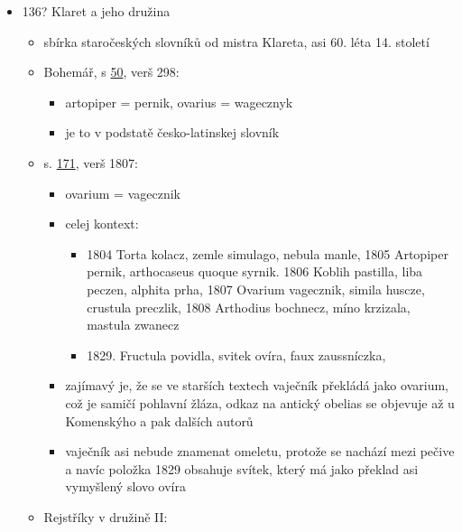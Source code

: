 \begin{itemize}
\tightlist
\item
  136? Klaret a jeho družina

  \begin{itemize}
  \tightlist
  \item
    sbírka staročeských slovníků od mistra Klareta, asi 60. léta 14.
    století
  \item
    Bohemář, s
    \href{https://sources.cms.flu.cas.cz/src/index.php?s=v&bookid=832&page=84}{50},
    verš 298:

    \begin{itemize}
    \tightlist
    \item
      artopiper = pernik, ovarius = wagecznyk
    \item
      je to v podstatě česko-latinskej slovník
    \end{itemize}
  \item
    s.
    \href{https://nlp.fi.muni.cz/projekty/ahisto/portal/book/832?lpage=171&search=vage}{171},
    verš 1807:

    \begin{itemize}
    \tightlist
    \item
      ovarium = vagecznik
    \item
      celej kontext:

      \begin{itemize}
      \tightlist
      \item
        1804 Torta kolacz, zemle simulago, nebula manle, 1805 Artopiper
        pernik, arthocaseus quoque syrnik. 1806 Koblih pastilla, liba
        peczen, alphita prha, 1807 Ovarium vagecznik, simila huscze,
        crustula preczlik, 1808 Arthodius bochnecz, míno krzizala,
        mastula zwanecz
      \item
        1829. Fructula povidla, svitek ovíra, faux zaussníczka,
      \end{itemize}
    \item
      zajímavý je, že se ve starších textech vaječník překládá jako
      ovarium, což je samičí pohlavní žláza, odkaz na antický obelias se
      objevuje až u Komenskýho a pak dalších autorů
    \item
      vaječník asi nebude znamenat omeletu, protože se nachází mezi
      pečive a navíc položka 1829 obsahuje svítek, který má jako překlad
      asi vymyšlený slovo ovíra
    \end{itemize}
  \item
    Rejstříky v družině II:


\end{itemize}
\end{itemize}
